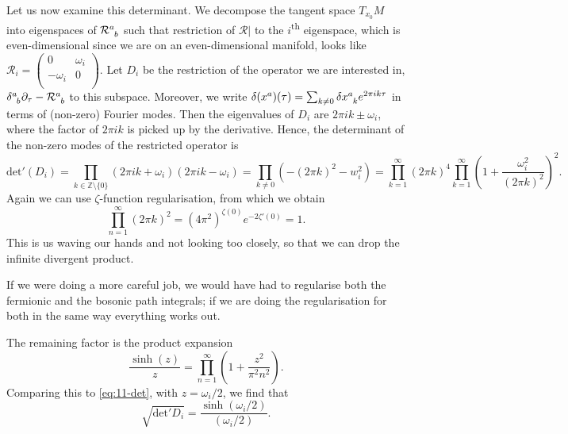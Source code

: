 
Let us now examine this determinant.
We decompose the tangent space $T_{x_0} M$ into eigenspaces of $\mathcal{R}\indices{^{a}_{b}}$ such that restriction of $\mathcal{R}\rvert$ to the $i$\textsuperscript{th} eigenspace, which is even-dimensional since we are on an even-dimensional manifold, looks like
$
  \mathcal{R}_i = 
  \begin{pmatrix}
   0 & \omega_{i} \\
   -\omega_i & 0 \\
  \end{pmatrix}.
$
Let $D_i$ be the restriction of the operator we are interested in, $\delta\indices{^{a}_{b}}  \partial_{\tau} - \mathcal{R}\indices{^{a}_{b}}$ to this subspace.
Moreover, we write $\delta(x^{a})(\tau) = \sum_{k \neq 0} \delta x\indices{^{a}_{k}} e^{2 \pi i k \tau}$ in terms of (non-zero) Fourier modes.
Then the eigenvalues of $D_i$ are $2 \pi i k \pm \omega_i$, where the factor of $2\pi i k$ is picked up by the derivative. Hence, the determinant of the non-zero modes of the restricted operator is
\begin{equation}
  \label{eq:11-det}
  \text{det}'(D_i) = \prod_{k \in \mathbb{Z} \setminus \{0\}} (2 \pi i k + \omega_i) (2 \pi i k - \omega_i) = \prod_{k\neq 0} (- (2 \pi k)^2 - w_i^2) = \prod_{k = 1}^\infty (2 \pi k)^4 \prod_{k = 1}^\infty \left( 1 + \frac{\omega_i^2}{(2 \pi k)^2} \right)^2.
\end{equation}
Again we can use $\zeta$-function regularisation, from which we obtain
\begin{equation}
  \prod_{n = 1}^\infty (2 \pi k)^2 = (4 \pi^2)^{\zeta(0)} e^{-2 \zeta'(0)} = 1.
\end{equation}
This is us waving our hands and not looking too closely, so that we can drop the infinite divergent product.
\begin{leftbar}
If we were doing a more careful job, we would have had to regularise both the fermionic and the bosonic path integrals; if we are doing the regularisation for both in the same way everything works out.
\end{leftbar}
The remaining factor is the product expansion 
\begin{equation}
  \frac{\sinh (z)}{z} = \prod_{n = 1}^\infty \left( 1 + \frac{z^2}{\pi^2 n^2} \right).
\end{equation}
Comparing this to \eqref{eq:11-det}, with $z = \omega_i/2$, we find that
\begin{equation}
\sqrt{\text{det}' D_i} = \frac{\sinh (\omega_i / 2)}{(\omega_i / 2)}.
\end{equation}
